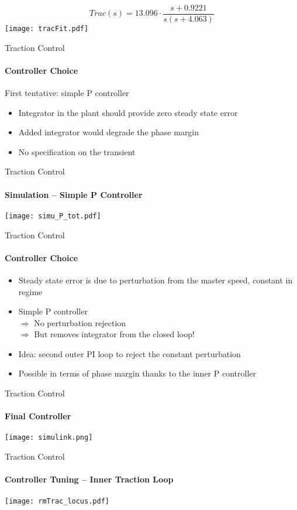\begin{frame}
\[Trac(s) = 13.096\cdot\frac{s+0.9221}{s(s+4.063)}\]
\texttt{[image: tracFit.pdf]}
\end{frame}

\begin{frame}{Traction Control}
\framesubtitle{Controller Choice}
\begin{block}{First tentative: simple P controller}
\begin{itemize}
\item Integrator in the plant should provide zero steady state error
\item Added integrator would degrade the phase margin
\item No specification on the transient
\end{itemize}
\end{block}
\end{frame}

\begin{frame}{Traction Control}
\centering
\framesubtitle{Simulation -- Simple P Controller}
\texttt{[image: simu\_P\_tot.pdf]}
\end{frame}

\begin{frame}{Traction Control}
\framesubtitle{Controller Choice}
\begin{itemize}
\item Steady state error is due to perturbation from the master speed, constant in regime
\item Simple P controller
\\$\Rightarrow$ No perturbation rejection
\\$\Rightarrow$ But removes integrator from the closed loop!
\item Idea: second outer PI loop to reject the constant perturbation
\item Possible in terms of phase margin thanks to the inner P controller
\end{itemize}
\end{frame}

\begin{frame}{Traction Control}
\framesubtitle{Final Controller}
\texttt{[image: simulink.png]}
\end{frame}

\begin{frame}{Traction Control}
\framesubtitle{Controller Tuning -- Inner Traction Loop}
\texttt{[image: rmTrac\_locus.pdf]}
\end{frame}

